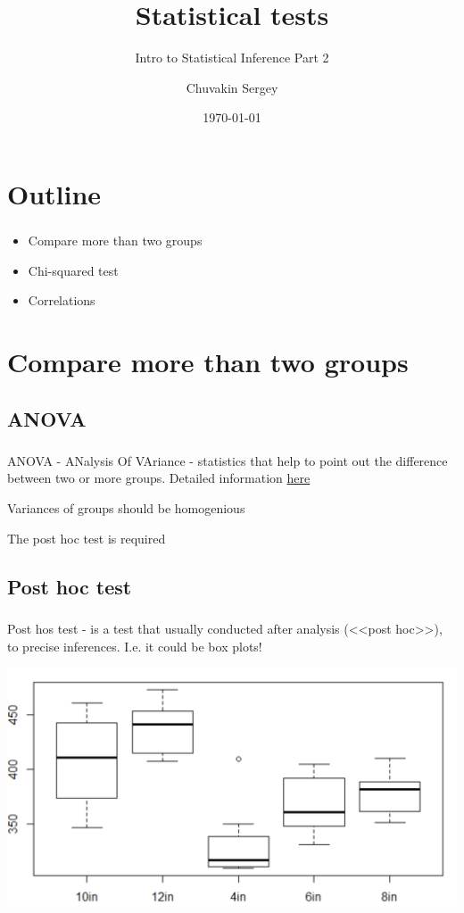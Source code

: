 \documentclass[t, 11pt]{beamer}
\title {Statistical tests}
\subtitle{Intro to Statistical Inference Part 2}
\author{Chuvakin Sergey}
\date{\today}
\institute[<<Anthropology>>]{<<School of Advanced Studies>>}
\newcommand\Warning{%
	\makebox[1.4em][c]{%
		\makebox[0pt][c]{\raisebox{.1em}{\small!}}%
		\makebox[0pt][c]{\color{red}\Large$\bigtriangleup$}}}%
\begin{document}
	
	\frame[plain]{\titlepage}		
	
	\section{Outline}
	
		\begin{frame} 
			\frametitle{\insertsection} 
			\begin{itemize}
				\item Compare more than two groups
				\item Chi-squared test
				\item Correlations
			\end{itemize}
		\end{frame}
		
	\section{Compare more than two groups}
	
	\subsection{ANOVA}
	\begin{frame} 
		\frametitle{\insertsection} 
		ANOVA - ANalysis Of VAriance - statistics that help to point out the difference between two or more groups. Detailed information \href{https://www.statsdirect.com/help/analysis_of_variance/one_way.htm} {here}
		
		\vspace{1cm}
		
		\Warning Variances of groups should be homogenious
		
		\Warning The post hoc test is required


	\end{frame}

	\subsection{Post hoc test}
\begin{frame} 
	\frametitle{\insertsection} 	
	
	Post hos test - is a test that usually conducted after analysis (<<post hoc>>), to precise inferences. I.e. it could be box plots! 
	
	\begin{center}
		\includegraphics[scale=0.4]{post-hoc}
	\end{center}
	
\end{frame}
\end{document}
